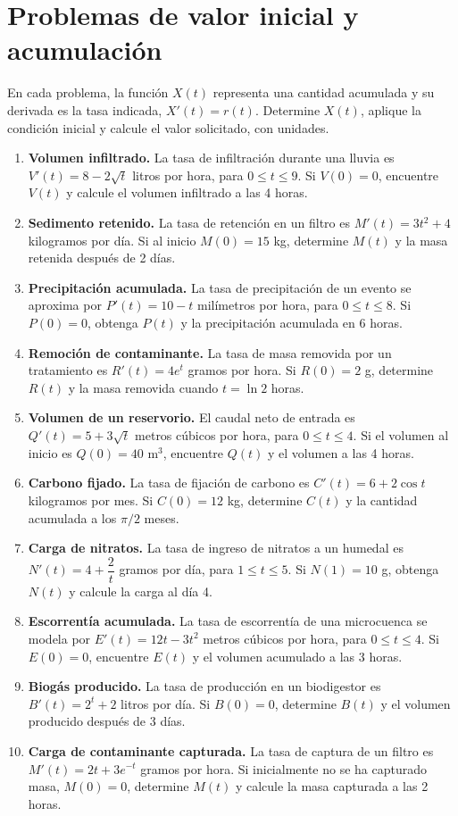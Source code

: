 \documentclass[11pt,a4paper]{article}
\begin{document}
\section{Problemas de valor inicial y acumulación}

En cada problema, la función $X(t)$ representa una cantidad acumulada y su derivada es la tasa indicada, $X'(t)=r(t)$. Determine $X(t)$, aplique la condición inicial y calcule el valor solicitado, con unidades.

\begin{enumerate}[leftmargin=*,itemsep=9pt,label=\textbf{\arabic*.},start=11]
  \item \textbf{Volumen infiltrado.} La tasa de infiltración durante una lluvia es $V'(t)=8-2\sqrt{t}$ litros por hora, para $0\leq t\leq9$. Si $V(0)=0$, encuentre $V(t)$ y calcule el volumen infiltrado a las 4 horas.
  \item \textbf{Sedimento retenido.} La tasa de retención en un filtro es $M'(t)=3t^2+4$ kilogramos por día. Si al inicio $M(0)=15$ kg, determine $M(t)$ y la masa retenida después de 2 días.
  \item \textbf{Precipitación acumulada.} La tasa de precipitación de un evento se aproxima por $P'(t)=10-t$ milímetros por hora, para $0\leq t\leq8$. Si $P(0)=0$, obtenga $P(t)$ y la precipitación acumulada en 6 horas.
  \item \textbf{Remoción de contaminante.} La tasa de masa removida por un tratamiento es $R'(t)=4e^t$ gramos por hora. Si $R(0)=2$ g, determine $R(t)$ y la masa removida cuando $t=\ln 2$ horas.
  \item \textbf{Volumen de un reservorio.} El caudal neto de entrada es $Q'(t)=5+3\sqrt{t}$ metros cúbicos por hora, para $0\leq t\leq4$. Si el volumen al inicio es $Q(0)=40$ m$^3$, encuentre $Q(t)$ y el volumen a las 4 horas.
  \item \textbf{Carbono fijado.} La tasa de fijación de carbono es $C'(t)=6+2\cos t$ kilogramos por mes. Si $C(0)=12$ kg, determine $C(t)$ y la cantidad acumulada a los $\pi/2$ meses.
  \item \textbf{Carga de nitratos.} La tasa de ingreso de nitratos a un humedal es $N'(t)=4+\dfrac{2}{t}$ gramos por día, para $1\leq t\leq5$. Si $N(1)=10$ g, obtenga $N(t)$ y calcule la carga al día 4.
  \item \textbf{Escorrentía acumulada.} La tasa de escorrentía de una microcuenca se modela por $E'(t)=12t-3t^2$ metros cúbicos por hora, para $0\leq t\leq4$. Si $E(0)=0$, encuentre $E(t)$ y el volumen acumulado a las 3 horas.
  \item \textbf{Biogás producido.} La tasa de producción en un biodigestor es $B'(t)=2^t+2$ litros por día. Si $B(0)=0$, determine $B(t)$ y el volumen producido después de 3 días.
  \item \textbf{Carga de contaminante capturada.} La tasa de captura de un filtro es $M'(t)=2t+3e^{-t}$ gramos por hora. Si inicialmente no se ha capturado masa, $M(0)=0$, determine $M(t)$ y calcule la masa capturada a las 2 horas.
\end{enumerate}
\end{document}
